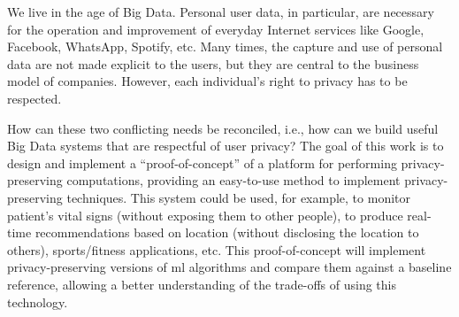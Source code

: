 We live in the age of Big Data. Personal user data, in particular, are necessary for the operation and improvement of everyday Internet services like Google, Facebook, WhatsApp, Spotify, etc. Many times, the capture and use of personal data are not made explicit to the users, but they are central to the business model of companies. However, each individual's right to privacy has to be respected.

How can these two conflicting needs be reconciled, i.e., how can we build useful Big Data systems that are respectful of user privacy?
The goal of this work is to design and implement a ``proof-of-concept'' of a platform for performing privacy-preserving computations, providing an easy-to-use method to implement privacy-preserving techniques. This system could be used, for example, to monitor patient's vital signs (without exposing them to other people), to produce real-time recommendations based on location (without disclosing the location to others), sports/fitness applications, etc.
This proof-of-concept will implement privacy-preserving versions of \ac{ml} algorithms and compare them against a baseline reference, allowing a better understanding of the trade-offs of using this technology.

\newpage
